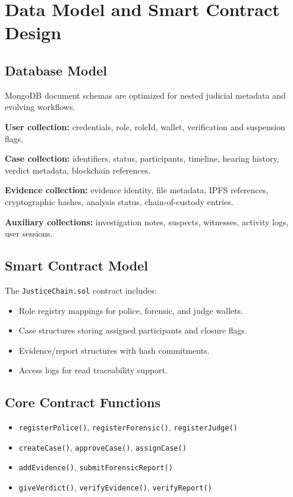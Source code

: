 \documentclass[conference]{IEEEtran}
\begin{document}
\section{Data Model and Smart Contract Design}
\subsection{Database Model}
MongoDB document schemas are optimized for nested judicial metadata and evolving workflows.

\textbf{User collection:} credentials, role, roleId, wallet, verification and suspension flags.

\textbf{Case collection:} identifiers, status, participants, timeline, hearing history, verdict metadata, blockchain references.

\textbf{Evidence collection:} evidence identity, file metadata, IPFS references, cryptographic hashes, analysis status, chain-of-custody entries.

\textbf{Auxiliary collections:} investigation notes, suspects, witnesses, activity logs, user sessions.

\subsection{Smart Contract Model}
The \texttt{JusticeChain.sol} contract includes:
\begin{itemize}
    \item Role registry mappings for police, forensic, and judge wallets.
    \item Case structures storing assigned participants and closure flags.
    \item Evidence/report structures with hash commitments.
    \item Access logs for read traceability support.
\end{itemize}

\subsection{Core Contract Functions}
\begin{itemize}
    \item \texttt{registerPolice()}, \texttt{registerForensic()}, \texttt{registerJudge()}
    \item \texttt{createCase()}, \texttt{approveCase()}, \texttt{assignCase()}
    \item \texttt{addEvidence()}, \texttt{submitForensicReport()}
    \item \texttt{giveVerdict()}, \texttt{verifyEvidence()}, \texttt{verifyReport()}
\end{itemize}
\end{document}
